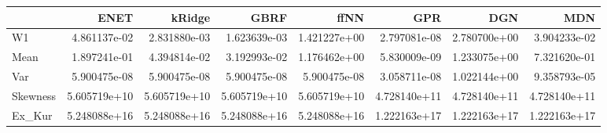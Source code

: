 \begin{tabular}{lrrrrrrr}
\toprule
{} &          ENET &        kRidge &          GBRF &          ffNN &           GPR &           DGN &           MDN \\
\midrule
W1       &  4.861137e-02 &  2.831880e-03 &  1.623639e-03 &  1.421227e+00 &  2.797081e-08 &  2.780700e+00 &  3.904233e-02 \\
Mean     &  1.897241e-01 &  4.394814e-02 &  3.192993e-02 &  1.176462e+00 &  5.830009e-09 &  1.233075e+00 &  7.321620e-01 \\
Var      &  5.900475e-08 &  5.900475e-08 &  5.900475e-08 &  5.900475e-08 &  3.058711e-08 &  1.022144e+00 &  9.358793e-05 \\
Skewness &  5.605719e+10 &  5.605719e+10 &  5.605719e+10 &  5.605719e+10 &  4.728140e+11 &  4.728140e+11 &  4.728140e+11 \\
Ex\_Kur   &  5.248088e+16 &  5.248088e+16 &  5.248088e+16 &  5.248088e+16 &  1.222163e+17 &  1.222163e+17 &  1.222163e+17 \\
\bottomrule
\end{tabular}
